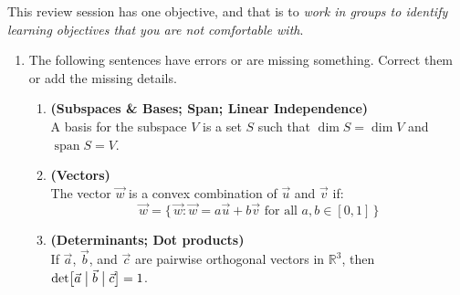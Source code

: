 \documentclass[red]{tutorial}
\newcommand{\R}{\mathbb{R}}
\newcommand{\mute}[1]{}
\DeclareMathOperator{\Span} {span}
\theoremstyle{definition}
\theoremstyle{theorem}
\begin{document}
\begin{tutorial}
  \begin{objectives}
    This review session has one objective, and that is to
    \emph{work in groups to identify learning objectives that you
    are not comfortable with}.
  \end{objectives}
  \begin{enumerate}
    \item \label{q:mistake}
      The following sentences have errors or are missing something. 
      Correct them or add the missing details.
      \begin{enumerate}
          \mute{
        \item \textbf{(Linear Transformations)}\\
          A transformation $f\colon\R^n\to \R^m$ is linear if
          it sends sums to sums, $f(\vec0) = \vec0$, and
          $f(\alpha \vec x) = \alpha f(\vec x)$.
        \item
          An $n\times m$ matrix corresponds to a linear
          transformation from $\R^n$
          to $\R^m$.
        }
        \item \textbf{(Subspaces \& Bases; Span; Linear Independence)}\\
          A basis for the subspace $V$ is a set $S$
          such that $\dim S = \dim V$ and $\Span S = V$.
        \item \textbf{(Vectors)}\\
          The vector $\vec w$ is a convex combination 
          of $\vec u$ and $\vec v$ if:
          \begin{equation*}
            \vec w =
            \bigl\{\,\vec w:\vec w = a\vec u %
            +b\vec v \text{ for all } a,b\in [0,1]\,
            \bigr\}
          \end{equation*}
        \item \textbf{(Determinants; Dot products)} \\
          If $\vec a$, $\vec b$, and $\vec c$ are pairwise orthogonal
          vectors in $\R^3$, then
          $\det \bigl[\vec a\bigm|\vec b\bigm|\vec c\bigr] = 1$.

\end{enumerate}
\end{enumerate}
\end{tutorial}
\end{document}
